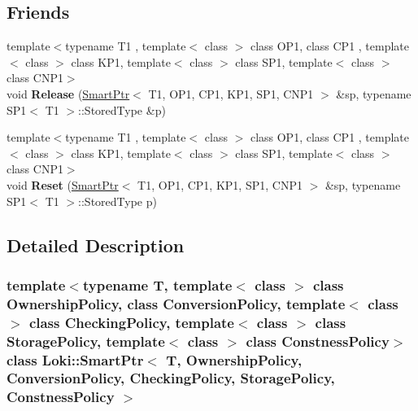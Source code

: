 \subsection*{Friends}
\begin{DoxyCompactItemize}
\item 
\hypertarget{classLoki_1_1SmartPtr_a1c09b79eccdf16403892fc68d84d20db}{}{\footnotesize template$<$typename T1 , template$<$ class $>$ class O\+P1, class C\+P1 , template$<$ class $>$ class K\+P1, template$<$ class $>$ class S\+P1, template$<$ class $>$ class C\+N\+P1$>$ }\\void {\bfseries Release} (\hyperlink{classLoki_1_1SmartPtr}{Smart\+Ptr}$<$ T1, O\+P1, C\+P1, K\+P1, S\+P1, C\+N\+P1 $>$ \&sp, typename S\+P1$<$ T1 $>$\+::Stored\+Type \&p)\label{classLoki_1_1SmartPtr_a1c09b79eccdf16403892fc68d84d20db}

\item 
\hypertarget{classLoki_1_1SmartPtr_a75182d85b8ef20fe584d0199a4302e11}{}{\footnotesize template$<$typename T1 , template$<$ class $>$ class O\+P1, class C\+P1 , template$<$ class $>$ class K\+P1, template$<$ class $>$ class S\+P1, template$<$ class $>$ class C\+N\+P1$>$ }\\void {\bfseries Reset} (\hyperlink{classLoki_1_1SmartPtr}{Smart\+Ptr}$<$ T1, O\+P1, C\+P1, K\+P1, S\+P1, C\+N\+P1 $>$ \&sp, typename S\+P1$<$ T1 $>$\+::Stored\+Type p)\label{classLoki_1_1SmartPtr_a75182d85b8ef20fe584d0199a4302e11}

\end{DoxyCompactItemize}


\subsection{Detailed Description}
\subsubsection*{template$<$typename T, template$<$ class $>$ class Ownership\+Policy, class Conversion\+Policy, template$<$ class $>$ class Checking\+Policy, template$<$ class $>$ class Storage\+Policy, template$<$ class $>$ class Constness\+Policy$>$class Loki\+::\+Smart\+Ptr$<$ T, Ownership\+Policy, Conversion\+Policy, Checking\+Policy, Storage\+Policy, Constness\+Policy $>$}


